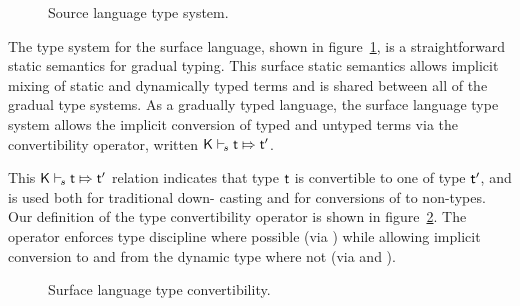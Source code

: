 \documentclass[a4paper,USenglish]{tex/lipics-v2016}
\begin{document}
\begin{figure}[!h]
\begin{mathpar}
          \end{mathpar}
  
  \vspace{2mm}
  
  \hrulefill
  \caption{Source language type system.}\label{fig:slts}
\end{figure}

The type system for the surface language, shown in figure~\ref{fig:slts}, is a
straightforward static semantics for gradual typing. This surface static
semantics allows implicit mixing of static and dynamically typed terms and is
shared between all of the gradual type systems. As a gradually typed language,
the surface language type system allows the implicit conversion of typed and
untyped terms via the convertibility operator, written
$\ConvertE\K{s}{\t}{\tp}$.

This $\ConvertE\K{s}{\t}{\tp}$ relation indicates that type $\t$ is
convertible to one of type $\tp$, and is used both for traditional down-
casting and for conversions of \any to non-\any types. Our definition of the
type convertibility operator is shown in figure~\ref{fig:tyconvert}. The
operator enforces type discipline where possible (via )
while allowing implicit conversion to and from the dynamic type where not (via
 and ).

\begin{figure}[!h]
  \hrulefill  \small  \vspace{-3mm}
  
  \begin{mathpar}
    
    
  \end{mathpar}
  \vspace{-8mm}
  
  \hrulefill
  \caption{Surface language type convertibility.}\label{fig:tyconvert}
\end{figure}
\end{document}
